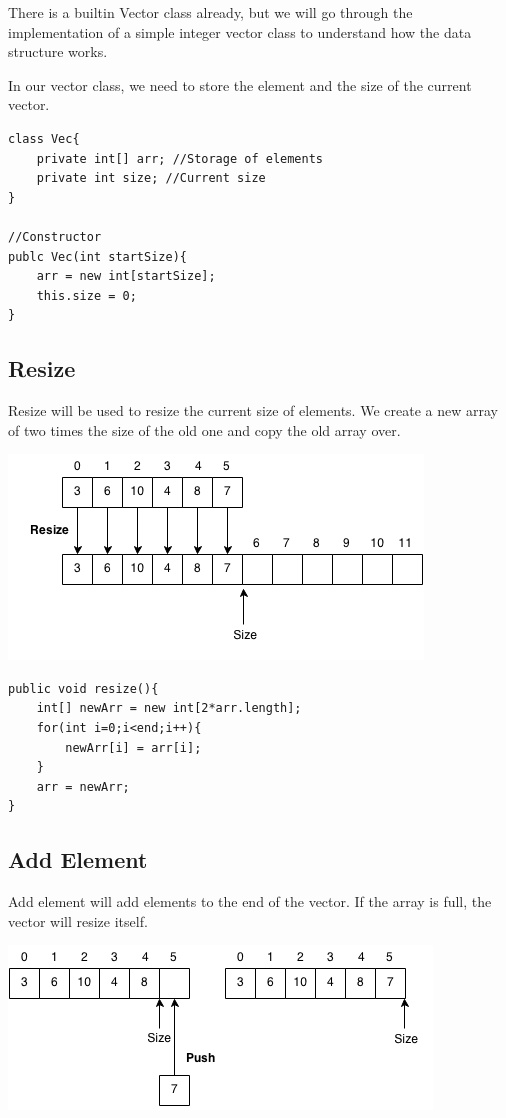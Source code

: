 \documentclass[11pt,oneside]{book}
\makeatletter
\def\maxwidth#1{\ifdim\Gin@nat@width>#1 #1\else\Gin@nat@width\fi}
\makeatother
\begin{document}
There is a builtin Vector class already, but we will go through the implementation of a simple integer vector class to understand how the data structure works.

In our vector class, we need to store the element and the size of the current vector.

\begin{lstlisting}
class Vec{
    private int[] arr; //Storage of elements
    private int size; //Current size
}

//Constructor
publc Vec(int startSize){
    arr = new int[startSize];
    this.size = 0;
}

\end{lstlisting}

\subsection{Resize}

Resize will be used to resize the current size of elements. We create a new array of two times the size of the old one and copy the old array over.

\vspace{5px}\includegraphics[width=\maxwidth{\textwidth}]{vector3.png}

\begin{lstlisting}
public void resize(){
    int[] newArr = new int[2*arr.length];
    for(int i=0;i<end;i++){
        newArr[i] = arr[i];
    }
    arr = newArr;
}
\end{lstlisting}

\subsection{Add Element}

Add element will add elements to the end of the vector. If the array is full, the vector will resize itself.

\vspace{5px}\includegraphics[width=\maxwidth{\textwidth}]{vector2.png}
\end{document}
